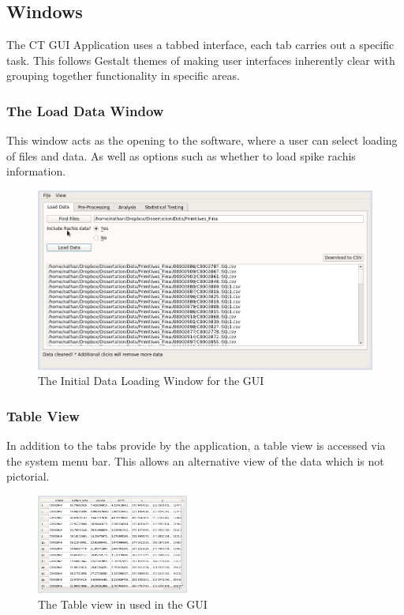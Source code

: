 \documentclass[11pt]{report}
\begin{document}
\subsection{Windows}
\label{sec:orge0d0ab6}
The CT GUI Application uses a tabbed interface, each tab carries out a specific task. This follows Gestalt themes of making user interfaces inherently clear with grouping together functionality in specific areas.

\subsubsection{The Load Data Window}
\label{sec:org6dabef6}
This window acts as the opening to the software, where a user can select loading of files and data. As well as options such as whether to load spike rachis information.
\begin{figure}[htbp]
\centering
\includegraphics[width=11.5cm]{./images/Screenshots/clean_data_remove_large.png}
\caption{\label{fig:org0a46bf4}
The Initial Data Loading Window for the GUI}
\end{figure}
\subsubsection{Table View}
\label{sec:org8301076}
In addition to the tabs provide by the application, a table view is accessed via the system menu bar. This allows an alternative view of the data which is not pictorial.
\begin{figure}[htbp]
\centering
\includegraphics[width=5cm]{./images/table.png}
\caption{\label{fig:org9f9899c}
The Table view in used in the GUI}
\end{figure}
\end{document}
